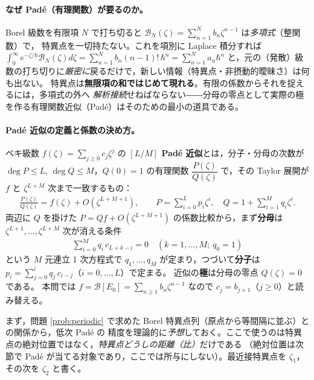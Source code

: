 \documentclass[dvipdfmx, uplatex]{jsarticle}
\newcommand{\hb}{\hbar}
\newcommand{\Bor}{\mathcal{B}}
\theoremstyle{definition}
\begin{document}
\paragraph{なぜ Pad\'e（有理関数）が要るのか。}
Borel 級数を有限項 $N$ で打ち切ると $\Bor_N(\zeta)=\sum_{n=1}^N b_n\zeta^{n-1}$ は\emph{多項式}（整関数）で，
特異点を一切持たない。これを項別に Laplace 積分すれば
$\int_0^\infty e^{-\zeta/\hb}\Bor_N(\zeta)d\zeta=\sum_{n=1}^N b_n(n-1)!\,\hb^n=\sum_{n=1}^N a_n\hb^n$
と，元の（発散）級数の打ち切りに\emph{厳密に}戻るだけで，新しい情報（特異点・非摂動的曖昧さ）は何も出ない。
特異点は\textbf{無限項の和ではじめて現れる}。有限の係数からそれを捉えるには，多項式の外へ
\emph{解析接続}せねばならない――分母の零点として実際の極を作る有理関数近似（Pad\'e）はそのための最小の道具である。

\paragraph{Pad\'e 近似の定義と係数の決め方。}
ベキ級数 $f(\zeta)=\sum_{j\ge0}c_j\zeta^j$ の \textbf{$[L/M]$ Pad\'e 近似}とは，分子・分母の次数が
$\deg P\le L$, $\deg Q\le M$，$Q(0)=1$ の有理関数 $\dfrac{P(\zeta)}{Q(\zeta)}$ で，その Taylor 展開が
$f$ と $\zeta^{L+M}$ 次まで一致するもの：
\begin{align}
    \frac{P(\zeta)}{Q(\zeta)}=f(\zeta)+O(\zeta^{L+M+1}),\qquad
    P=\sum_{i=0}^{L}p_i\zeta^i,\quad Q=1+\sum_{i=1}^{M}q_i\zeta^i .
\end{align}
両辺に $Q$ を掛けた $P=Qf+O(\zeta^{L+M+1})$ の係数比較から，まず\textbf{分母}は
$\zeta^{L+1},\dots,\zeta^{L+M}$ 次が消える条件
\begin{align}
    \sum_{i=0}^{M}q_i\,c_{L+k-i}=0\quad(k=1,\dots,M;\ q_0=1)
\label{eq:padeden}
\end{align}
という $M$ 元連立 1 次方程式で $q_1,\dots,q_M$ が定まり，つづいて\textbf{分子}は
$p_i=\sum_{j=0}^{i}q_j\,c_{i-j}$（$i=0,\dots,L$）で定まる。
近似の\textbf{極}は分母の零点 $Q(\zeta)=0$ である。
本問では $f=\Bor[E_0]=\sum_{n\ge1}b_n\zeta^{n-1}$ なので $c_j=b_{j+1}$（$j\ge0$）と読み替える。

まず，問題 \ref{prob:periodic} で求めた Borel 特異点列（原点から等間隔に並ぶ）との関係から，低次 Pad\'e の
精度を理論的に\emph{予想}しておく。ここで使うのは特異点の絶対位置ではなく，\emph{特異点どうしの距離（比）}だけである
（絶対位置は次節で Pad\'e が当てる対象であり，ここでは所与にしない）。最近接特異点を $\zeta_1$，その次を $\zeta_2$ と書く。
\end{document}
